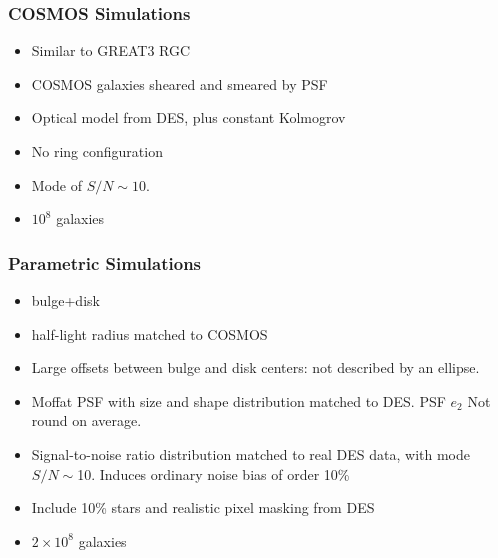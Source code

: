 \documentclass{beamer}
\begin{document}
\frame
{
    \frametitle{COSMOS Simulations}

 
    \begin{itemize}
        \item Similar to {\color{lightskyblue} GREAT3 RGC}

        \item COSMOS galaxies sheared and smeared by PSF

        \item Optical model from DES, plus constant Kolmogrov
        \item {\color{gold} No ring} configuration
        \item Mode of {\color{orange} $S/N \sim 10$}.
        \item $10^8$ galaxies
    \end{itemize}

}
\frame
{
    \frametitle{Parametric Simulations}

 
    \begin{itemize}

        \item {\color{gold} bulge+disk}

        \item half-light radius matched to COSMOS

        \item Large offsets between bulge and disk centers:
            {\color{green} not described by an ellipse}.

        \item Moffat PSF with size and shape distribution
            matched to DES.  PSF $e_2$ Not round on average.

        \item Signal-to-noise ratio distribution matched to real DES
            data, with {\color{lightskyblue} mode $S/N \sim$10}.  Induces ordinary noise
            bias of order 10\%
        
        \item Include 10\% {\color{brightred} stars} and realistic pixel
            {\color{orange} masking} from DES

        \item $2 \times 10^8$ galaxies


    \end{itemize}

}
\end{document}
